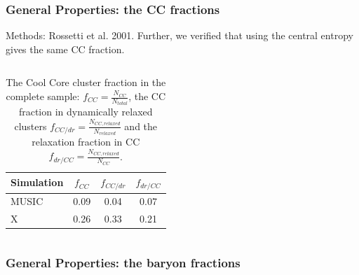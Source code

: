 \documentclass[aspectratio=43]{beamer}
\begin{document}
\begin{frame}
  \frametitle{General Properties: the CC fractions}
  Methods: Rossetti et al. 2001. Further, we verified that using the central entropy gives the same CC fraction.
\begin{columns}
  \begin{column}{\textwidth}
    \begin{table}
      \centering
      \caption{The Cool Core cluster fraction in the complete sample: $f_{CC} = \frac{N_{CC}}{N_{total}}$, the CC fraction in dynamically relaxed clusters $f_{CC/dr} = \frac{N_{CC, relaxed}}{N_{relaxed}}$ and the relaxation fraction in CC $f_{dr/CC} = \frac{N_{CC, relaxed}}{N_{CC}}$.}
      \label{tab:ccf}
      \begin{tabular}{lccc} %
        \hline
        Simulation & $f_{CC}$ & $f_{CC/dr}$ & $f_{dr/CC}$ \\
        \hline
        {\sc MUSIC}	& \alert{0.09} & 0.04 & 0.07\\
        {\sc X} 		& \alert{0.26} & 0.33 & 0.21\\
      \end{tabular}
    \end{table}
  \end{column}
\end{columns}
\end{frame}

\begin{frame}
  \frametitle{General Properties: the baryon fractions}
\end{frame}
\end{document}
